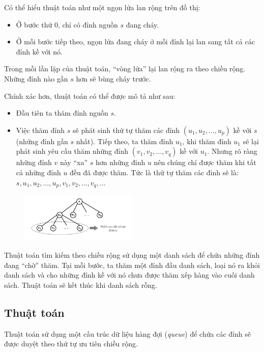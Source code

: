 Có thể hiểu thuật toán như một ngọn lửa lan rộng trên đồ thị:

\begin{itemize}
    \item Ở bước thứ $0$, chỉ có đỉnh nguồn $s$ đang cháy.
    \item Ở mỗi bước tiếp theo, ngọn lửa đang cháy ở mỗi đỉnh lại lan sang tất cả các đỉnh kề với nó.
\end{itemize}

Trong mỗi lần lặp của thuật toán, ``vòng lửa'' lại lan rộng ra theo chiều rộng. Những đỉnh nào gần $s$ hơn sẽ bùng cháy trước.

Chính xác hơn, thuật toán có thể được mô tả như sau:
\begin{itemize}
    \item Đầu tiên ta thăm đỉnh nguồn $s$.
    \item Việc thăm đỉnh $s$ sẽ phát sinh thứ tự thăm các đỉnh $(u_1, u_2, \ldots, u_p)$ kề với $s$ (những đỉnh gần $s$ nhất). Tiếp theo, ta thăm đỉnh $u_1$, khi thăm đỉnh $u_1$ sẽ lại phát sinh yêu cầu thăm những đỉnh $(v_1, v_2, \ldots, v_q)$ kề với $u_1$. Nhưng rõ ràng những đỉnh $v$ này ``xa'' $s$ hơn những đỉnh $u$ nên chúng chỉ được thăm khi tất cả những đỉnh $u$ đều đã được thăm. Tức là thứ tự thăm các đỉnh sẽ là: $s, u_1, u_2, \ldots, u_p, v_1, v_2, \ldots, v_q, \ldots$
\end{itemize}

\begin{figure}[h]
    \centering
    \includegraphics[width=0.5\textwidth]{resource/img/b6/breadth-first-search_img2.png}
\end{figure}

Thuật toán tìm kiếm theo chiều rộng sử dụng một danh sách để chứa những đỉnh đang ``chờ'' thăm. Tại mỗi bước, ta thăm một đỉnh đầu danh sách, loại nó ra khỏi danh sách và cho những đỉnh kề với nó chưa được thăm xếp hàng vào cuối danh sách. Thuật toán sẽ kết thúc khi danh sách rỗng.

\subsection{Thuật toán}

Thuật toán sử dụng một cấu trúc dữ liệu hàng đợi (\textit{queue}) để chứa các đỉnh sẽ được duyệt theo thứ tự ưu tiên chiều rộng.

